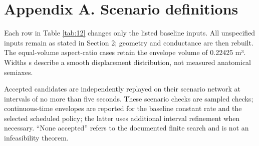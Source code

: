 \documentclass[12pt,a4paper]{article}
\begin{document}
\section*{Appendix A. Scenario definitions}
Each row in Table \ref{tab:12} changes only the listed baseline inputs. All unspecified inputs remain as stated in Section 2; geometry and conductance are then rebuilt. The equal-volume aspect-ratio cases retain the envelope volume of 0.22425 m³. Widths s describe a smooth displacement distribution, not measured anatomical semiaxes.

Accepted candidates are independently replayed on their scenario network at intervals of no more than five seconds. These scenario checks are sampled checks; continuous-time envelopes are reported for the baseline constant rate and the selected scheduled policy; the latter uses additional interval refinement when necessary. “None accepted” refers to the documented finite search and is not an infeasibility theorem.
\end{document}

